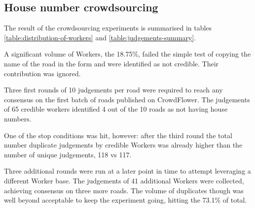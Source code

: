 \subsection{House number crowdsourcing}

The result of the crowdsourcing experiments is summarised in tables \ref{table:distribution-of-workers} and \ref{table:judgements-summary}. 

A significant volume of Workers, the 18.75\%, failed the simple test of copying the name of the road in the form and were identified as not credible. Their contribution was ignored.

Three first rounds of 10 judgements per road were required to reach any consensus on the first batch of roads published on CrowdFlower. The judgements of 65 credible workers identified 4 out of the 10 roads as not having house numbers.

One of the stop conditions was hit, however: after the third round the total number duplicate judgements by credible Workers was already higher than the number of unique judgements, 118 vs 117.

Three additional rounds were run at a later point in time to attempt leveraging a different Worker base. The judgements of 41 additional Workers were collected, achieving consensus on three more roads. The volume of duplicates though was well beyond acceptable to keep the experiment going, hitting the 73.1\% of total.

